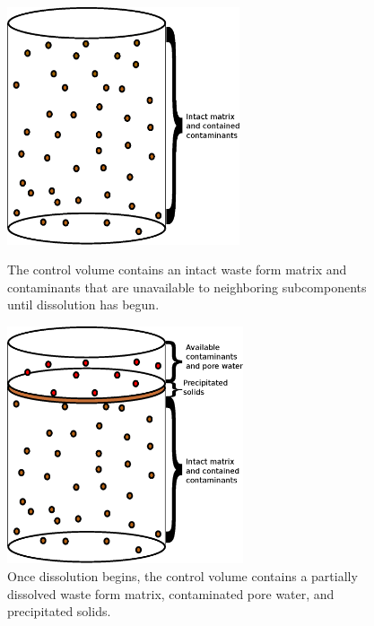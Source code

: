 \begin{figure}[h!]
\begin{minipage}[b]{0.5\linewidth}
  \begin{center}
    \includegraphics[height=7cm]{./chapters/future/contaminated1.eps}
  \end{center}
  \caption[Intact Waste Form Control Volume]{The control volume contains an intact waste form matrix 
  and contaminants that are unavailable to neighboring subcomponents until 
  dissolution has begun.}
  \label{fig:intact}
\end{minipage}
\hspace{0.5cm}
\begin{minipage}[b]{0.5\linewidth}
  \begin{center}
    \includegraphics[height=7cm]{./chapters/future/contaminated.eps}
  \end{center}
  \caption[Degrading Waste Form Control Volume]{Once dissolution begins, the control volume contains a partially 
  dissolved waste form matrix, contaminated pore water, and precipitated 
  solids.  }
  \label{fig:dissolved}
\end{minipage}
\end{figure}

